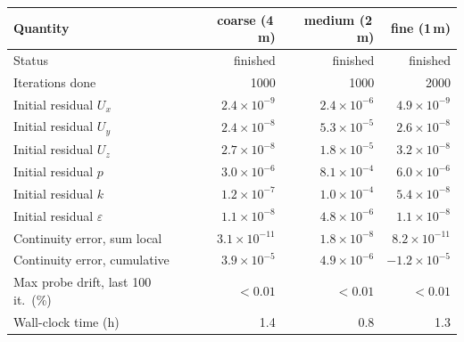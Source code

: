 \begin{tabular}{lrrr}
\toprule
Quantity & coarse (4\,m) & medium (2\,m) & fine (1\,m) \\
\midrule
Status & finished & finished & finished \\
Iterations done & 1000 & 1000 & 2000 \\
Initial residual $U_x$ & $2.4\times10^{-9}$ & $2.4\times10^{-6}$ & $4.9\times10^{-9}$ \\
Initial residual $U_y$ & $2.4\times10^{-8}$ & $5.3\times10^{-5}$ & $2.6\times10^{-8}$ \\
Initial residual $U_z$ & $2.7\times10^{-8}$ & $1.8\times10^{-5}$ & $3.2\times10^{-8}$ \\
Initial residual $p$ & $3.0\times10^{-6}$ & $8.1\times10^{-4}$ & $6.0\times10^{-6}$ \\
Initial residual $k$ & $1.2\times10^{-7}$ & $1.0\times10^{-4}$ & $5.4\times10^{-8}$ \\
Initial residual $\varepsilon$ & $1.1\times10^{-8}$ & $4.8\times10^{-6}$ & $1.1\times10^{-8}$ \\
Continuity error, sum local & $3.1\times10^{-11}$ & $1.8\times10^{-8}$ & $8.2\times10^{-11}$ \\
Continuity error, cumulative & $3.9\times10^{-5}$ & $4.9\times10^{-6}$ & $-1.2\times10^{-5}$ \\
Max probe drift, last 100 it.\ (\%) & $<0.01$ & $<0.01$ & $<0.01$ \\
Wall-clock time (h) & 1.4 & 0.8 & 1.3 \\
\bottomrule
\end{tabular}
